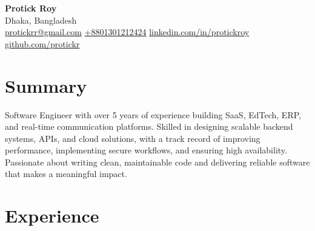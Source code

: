 \documentclass[a4paper,10pt]{article}
\begin{document}
{\LARGE \textbf{Protick Roy}}\\[-1pt]
Dhaka, Bangladesh \\
\href{mailto:protickrr@gmail.com}{protickrr@gmail.com} \textbar{} \href{tel:+8801301212424}{+8801301212424} \textbar{} 
\href{https://www.linkedin.com/in/protickroy}{linkedin.com/in/protickroy} \textbar{} 
\href{https://github.com/protickr}{github.com/protickr}

\vspace{6pt}

\section*{Summary}
Software Engineer with over 5 years of experience building SaaS, EdTech, ERP, and real-time communication platforms. 
Skilled in designing scalable backend systems, APIs, and cloud solutions, with a track record of improving performance, 
implementing secure workflows, and ensuring high availability. 
Passionate about writing clean, maintainable code and delivering reliable software that makes a meaningful impact.

\vspace{6pt}

\section*{Experience}
\end{document}
